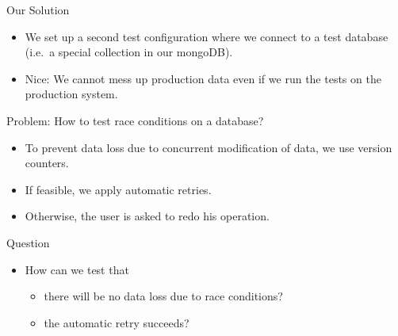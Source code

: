 \begin{frame}{Our Solution}
\begin{itemize}
\item We set up a second test configuration where we connect to a test database (i.e.~a special collection in our mongoDB).
\item Nice: We cannot mess up production data even if we run the tests on the production system.
\end{itemize}
\end{frame}

%


\begin{frame}{Problem: How to test race conditions on a database?}
\begin{itemize}
\item To prevent data loss due to concurrent modification of data, we use version counters.
\item If feasible, we apply automatic retries. 
\item Otherwise, the user is asked to redo his operation.
\end{itemize}
\end{frame}

\begin{frame}{Question}
\begin{itemize}
\item How can we test that 
\begin{itemize}
\item there will be no data loss due to race conditions?
\item the automatic retry succeeds?
\end{itemize}
\end{itemize}
\end{frame}


